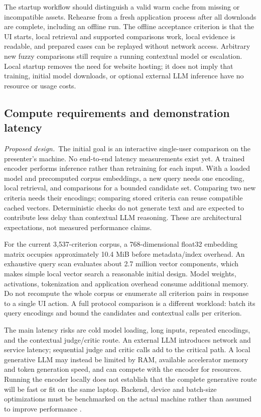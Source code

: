 \documentclass[10pt,letterpaper]{article}
\newcommand{\planned}{\textit{Proposed design.}}
\begin{document}
The startup workflow should distinguish a valid warm cache from missing or
incompatible assets. Rehearse from a fresh application process after all
downloads are complete, including an offline run. The offline acceptance
criterion is that the UI starts, local retrieval and supported comparisons
work, local evidence is readable, and prepared cases can be replayed without
network access. Arbitrary new fuzzy comparisons still require a running
contextual model or escalation. Local startup removes the need for website
hosting; it does not imply that training, initial model downloads, or optional
external LLM inference have no resource or usage costs.

\subsection{Compute requirements and demonstration latency}
\label{sec:demolatency}
\planned\ The initial goal is an interactive single-user comparison on the
presenter's machine. No end-to-end latency measurements exist yet. A trained
encoder performs inference rather than retraining for each input. With a
loaded model and precomputed corpus embeddings, a new query needs one
encoding, local retrieval, and comparisons for a bounded candidate set.
Comparing two new criteria needs their encodings; comparing stored criteria
can reuse compatible cached vectors. Deterministic checks do not generate
text and are expected to contribute less delay than contextual LLM reasoning.
These are architectural expectations, not measured performance claims.

For the current 3,537-criterion corpus, a 768-dimensional float32 embedding
matrix occupies approximately 10.4 MiB before metadata/index overhead.
An exhaustive query scan evaluates about 2.7 million vector components,
which makes simple local vector search a reasonable initial design. Model
weights, activations, tokenization and application overhead consume
additional memory. Do not recompute the whole corpus or enumerate all
criterion pairs in response to a single UI action. A full protocol comparison
is a different workload: batch its query encodings and bound the candidates
and contextual calls per criterion.

The main latency risks are cold model loading, long inputs, repeated
encodings, and the contextual judge/critic route. An external LLM introduces
network and service latency; sequential judge and critic calls add to the
critical path. A local generative LLM may instead be limited by RAM, available
accelerator memory and token generation speed, and can compete with the
encoder for resources. Running the encoder locally does not establish that
the complete generative route will be fast or fit on the same laptop.
Backend, device and batch-size optimizations must be benchmarked on the
actual machine rather than assumed to improve performance \cite{stefficiency}.
\end{document}
